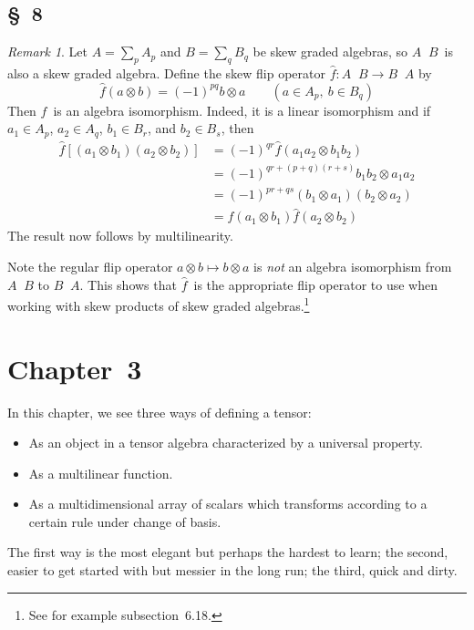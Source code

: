 \documentclass[letterpaper,12pt]{article}
\newcommand{\tprod}{\otimes}
\newcommand{\stprod}{\mathop{\widehat{\otimes}}}
\theoremstyle{definition}
\theoremstyle{remark}
\newtheorem*{rmk}{Remark}
\begin{document}
\subsection*{\S~8}
\begin{rmk}
Let \(A=\sum_p A_p\) and \(B=\sum_q B_q\) be skew graded algebras, so \(A\stprod B\)~is also a skew graded algebra. Define the skew flip operator \(\widehat{f}:A\stprod B\to B\stprod A\) by
\[\widehat{f}(a\tprod b)=(-1)^{pq}b\tprod a\qquad(a\in A_p,\ b\in B_q)\]
Then \(\widehat{f}\)~is an algebra isomorphism. Indeed, it is a linear isomorphism and if \(a_1\in A_p\), \(a_2\in A_q\), \(b_1\in B_r\), and \(b_2\in B_s\), then
\begin{align*}
\widehat{f}[(a_1\tprod b_1)(a_2\tprod b_2)]&=(-1)^{qr}\widehat{f}(a_1a_2\tprod b_1b_2)\\
	&=(-1)^{qr+(p+q)(r+s)}b_1b_2\tprod a_1a_2\\
	&=(-1)^{pr+qs}(b_1\tprod a_1)(b_2\tprod a_2)\\
	&=\widehat{f}(a_1\tprod b_1)\widehat{f}(a_2\tprod b_2)
\end{align*}
The result now follows by multilinearity.

Note the regular flip operator \(a\tprod b\mapsto b\tprod a\) is \emph{not} an algebra isomorphism from \(A\stprod B\) to \(B\stprod A\). This shows that \(\widehat{f}\)~is the appropriate flip operator to use when working with skew products of skew graded algebras.\footnote{See for example subsection~6.18.}
\end{rmk}

\newpage
\section*{Chapter~3}
In this chapter, we see three ways of defining a tensor:
\begin{itemize}[itemsep=0pt]
\item As an object in a tensor algebra characterized by a universal property.
\item As a multilinear function.
\item As a multidimensional array of scalars which transforms according to a certain rule under change of basis.
\end{itemize}
The first way is the most elegant but perhaps the hardest to learn; the second, easier to get started with but messier in the long run; the third, quick and dirty.
\end{document}
